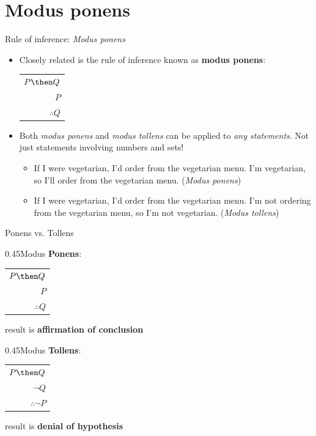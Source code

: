 \documentclass[12pt,aspectratio=1610, handout]{beamer}
\begin{document}
\section{Modus ponens}
\begin{frame}{Rule of inference: \emph{Modus ponens}}
	\begin{itemize}
		\item Closely related is the rule of inference known as \textbf{modus ponens}:
		\begin{center}
			\begin{tabular}{r}
				$P \then Q$ \\
				$P$ \\
				\hline
				$\therefore Q$
			\end{tabular}
		\end{center}
		\item Both \emph{modus ponens} and \emph{modus tollens} can be applied to \emph{any statements}. Not just statements involving numbers and sets! 
		\begin{itemize}
			\item If I were vegetarian, I'd order from the vegetarian menu. I'm vegetarian, so I'll order from the vegetarian menu. (\emph{Modus ponens})
			\item If I were vegetarian, I'd order from the vegetarian menu. I'm not ordering from the vegetarian menu, so I'm not vegetarian. (\emph{Modus tollens})
		\end{itemize}
	\end{itemize}
\end{frame}

\begin{frame}{Ponens vs. Tollens}	
	
	\begin{blockz}{0.45}{Modus \textbf{Ponens}: }

		\begin{tabular}{r}
			$P \then Q$ \\
			$P$ \\
			\hline
			$\therefore Q$
		\end{tabular}		
		\vspace{2mm} 
		
		result is \textbf{affirmation of conclusion}
	\end{blockz} \p 
	\begin{blockz}{0.45}{Modus \textbf{Tollens}: }

	\begin{tabular}{r}
		$P \then Q$ \\
		$\neg Q$ \\
		\hline
		$\therefore\neg P$
	\end{tabular}
	
	
	\vspace{2mm}  result is \textbf{denial of hypothesis}

	\end{blockz}
	
\end{frame}
\end{document}
